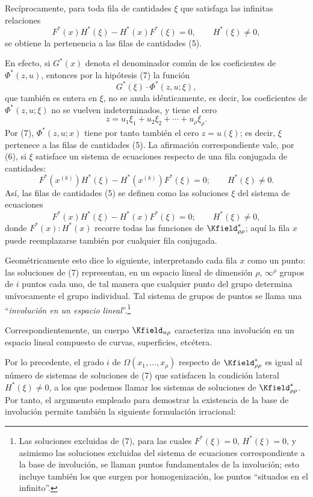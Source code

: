 \documentclass[11pt]{article}
\begin{document}
Recíprocamente, para toda fila de cantidades $\xi$ que satisfaga las infinitas relaciones
\begin{equation}
  F^*(x)H^*(\xi)-H^*(x)F^*(\xi)=0,
  \qquad H^*(\xi)\ne0,
\tag{7}
\end{equation}
se obtiene la pertenencia a las filas de cantidades (5).

En efecto, si $G^*(x)$ denota el denominador común de los coeficientes de $\Phi^*(z,u)$, entonces por la hipótesis (7) la función
\[
  G^*(\xi)\cdot\Phi^*(z,u;\xi),
\]
que también es entera en $\xi$, no se anula idénticamente, es decir, los coeficientes de $\Phi^*(z,u;\xi)$ no se vuelven indeterminados, y tiene el cero
\[
  z=u_1\xi_1+u_2\xi_2+\cdots+u_\rho\xi_\rho.
\]
Por (7), $\Phi^*(z,u;x)$ tiene por tanto también el cero $z=u(\xi)$; es decir, $\xi$ pertenece a las filas de cantidades (5). La afirmación correspondiente vale, por (6), si $\xi$ satisface un sistema de ecuaciones respecto de una fila conjugada de cantidades:
\[
  F^*(x^{(k)})H^*(\xi)-H^*(x^{(k)})F^*(\xi)=0;
  \qquad H^*(\xi)\ne0.
\]
Así, las filas de cantidades (5) se definen como las soluciones $\xi$ del sistema de ecuaciones
\[
  F^*(x)H^*(\xi)-H^*(x)F^*(\xi)=0;
  \qquad H^*(\xi)\ne0,
\]
donde $F^*(x):H^*(x)$ recorre todas las funciones de $\Kfield^*_{\rho\rho}$; aquí la fila $x$ puede reemplazarse también por cualquier fila conjugada.

Geométricamente esto dice lo siguiente, interpretando cada fila $x$ como un punto: las soluciones de (7) representan, en un espacio lineal de dimensión $\rho$, $\infty^\rho$ grupos de $i$ puntos cada uno, de tal manera que cualquier punto del grupo determina unívocamente el grupo individual. Tal sistema de grupos de puntos se llama una ``\emph{involución en un espacio lineal}''.\footnote{Las soluciones excluidas de (7), para las cuales $F^*(\xi)=0$, $H^*(\xi)=0$, y asimismo las soluciones excluidas del sistema de ecuaciones correspondiente a la base de involución, se llaman puntos fundamentales de la involución; esto incluye también los que surgen por homogenización, los puntos ``situados en el infinito''.}

Correspondientemente, un cuerpo $\Kfield_{n\rho}$ caracteriza una involución en un espacio lineal compuesto de curvas, superficies, etcétera.

Por lo precedente, el grado $i$ de $\Omega(x_1,\ldots,x_\rho)$ respecto de $\Kfield^*_{\rho\rho}$ es igual al número de sistemas de soluciones de (7) que satisfacen la condición lateral $H^*(\xi)\ne0$, a los que podemos llamar los sistemas de soluciones de $\Kfield^*_{\rho\rho}$. Por tanto, el argumento empleado para demostrar la existencia de la base de involución permite también la siguiente formulación irracional:
\end{document}
